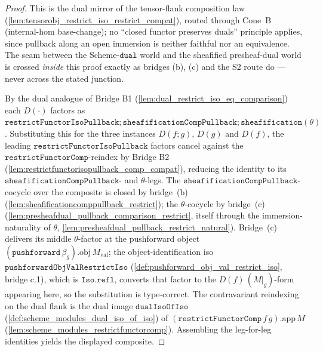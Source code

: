 \begin{proof}
  \leanok
  This is the dual mirror of the tensor-flank composition law
  (\cref{lem:tensorobj_restrict_iso_restrict_compat}), routed through Cone~B (internal-hom base-change);
  no ``closed functor preserves duals'' principle applies, since pullback along an open immersion is
  neither faithful nor an equivalence. The seam between the Scheme-\(\mathtt{dual}\) world and the
  sheafified presheaf-dual world is crossed \emph{inside} this proof exactly as bridges (b), (c) and the
  S2 route do --- never across the stated junction.

  By the dual analogue of Bridge B1 (\cref{lem:dual_restrict_iso_eq_comparison}) each
  \(D(\cdot)\) factors as \(\mathtt{restrictFunctorIsoPullback} \mathbin{;}
  \mathtt{sheafificationCompPullback} \mathbin{;} \mathtt{sheafification}(\theta)\). Substituting this for
  the three instances \(D(f\mathbin{;}g)\), \(D(g)\) and \(D(f)\), the leading
  \(\mathtt{restrictFunctorIsoPullback}\) factors cancel against the
  \(\mathtt{restrictFunctorComp}\)-reindex by Bridge B2 (\cref{lem:restrictfunctorisopullback_comp_compat}),
  reducing the identity to its \(\mathtt{sheafificationCompPullback}\)- and \(\theta\)-legs. The
  \(\mathtt{sheafificationCompPullback}\)-cocycle over the composite is closed by bridge~(b)
  (\cref{lem:sheafificationcomppullback_restrict}); the \(\theta\)-cocycle by bridge~(c)
  (\cref{lem:presheafdual_pullback_comparison_restrict}, itself through the immersion-naturality of
  \(\theta\), \cref{lem:presheafdual_pullback_restrict_natural}). Bridge~(c) delivers its middle
  \(\theta\)-factor at the pushforward object \((\mathtt{pushforward}\,\beta_g).\mathrm{obj}\,M_{\mathrm{val}}\);
  the object-identification iso \(\mathtt{pushforwardObjValRestrictIso}\)
  (\cref{def:pushforward_obj_val_restrict_iso}, bridge c.1), which is \(\mathtt{Iso.refl}\), converts that
  factor to the \(D(f)\,(M|_g)\)-form appearing here, so the substitution is type-correct. The
  contravariant reindexing on the dual flank is the dual image
  \(\mathtt{dualIsoOfIso}\) (\cref{def:scheme_modules_dual_iso_of_iso}) of
  \((\mathtt{restrictFunctorComp}\,f\,g).\mathrm{app}\,M\)
  (\cref{lem:scheme_modules_restrictfunctorcomp}). Assembling the leg-for-leg identities yields the
  displayed composite.
\end{proof}


